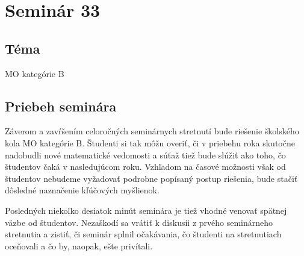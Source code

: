 \section*{Seminár 33}


\subsection*{Téma}
MO kategórie B

\subsection{Priebeh seminára}
Záverom a zavŕšením celoročných seminárnych stretnutí bude riešenie školského kola MO kategórie B. Študenti si tak môžu overiť, či v priebehu roka skutočne nadobudli nové matematické vedomosti a súťaž tiež bude slúžiť ako  toho, čo študentov čaká v nasledujúcom roku. Vzhľadom na časové možnosti však od študentov nebudeme vyžadovať podrobne popísaný postup riešenia, bude stačiť dôsledné naznačenie kľúčových myšlienok.

Posledných niekoľko desiatok minút seminára je tiež vhodné venovať spätnej väzbe od študentov. Nezaškodí sa vrátiť k diskusii z prvého seminárneho stretnutia a zistiť, či seminár splnil očakávania, čo študenti na stretnutiach oceňovali a čo by, naopak, ešte privítali.
